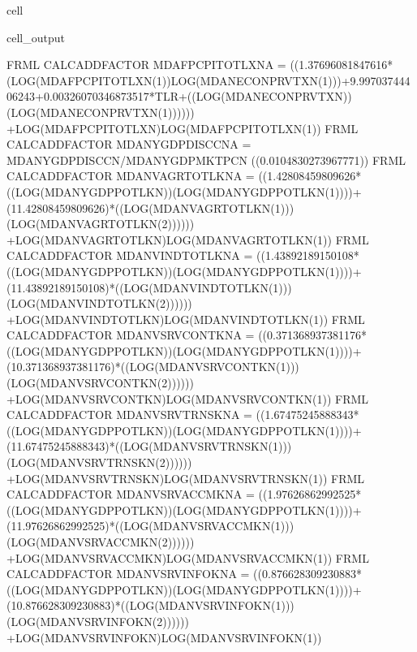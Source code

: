 \documentclass[letterpaper,10pt,english]{jupyterBook}
\begin{document}
\begin{sphinxuseclass}{cell}
\begin{sphinxVerbatimOutput}
\begin{sphinxuseclass}{cell_output}
\begin{sphinxVerbatim}[commandchars=\\\{\}]
FRML \PYGZlt{}CALC\PYGZus{}ADD\PYGZus{}FACTOR\PYGZgt{} MDAFPCPITOTLXN\PYGZus{}A = \PYGZhy{} ((\PYGZhy{}1.37696081847616*(LOG(MDAFPCPITOTLXN(\PYGZhy{}1))\PYGZhy{}LOG(MDANECONPRVTXN(\PYGZhy{}1)))+9.99703744406243+0.00326070346873517*T\PYGZus{}LR+((LOG(MDANECONPRVTXN))\PYGZhy{}(LOG(MDANECONPRVTXN(\PYGZhy{}1)))))) +LOG(MDAFPCPITOTLXN)\PYGZhy{}LOG(MDAFPCPITOTLXN(\PYGZhy{}1))\PYGZdl{}
FRML \PYGZlt{}CALC\PYGZus{}ADD\PYGZus{}FACTOR\PYGZgt{} MDANYGDPDISCCN\PYGZus{}A = MDANYGDPDISCCN/MDANYGDPMKTPCN\PYGZhy{} ((\PYGZhy{}0.0104830273967771)) \PYGZdl{}
FRML \PYGZlt{}CALC\PYGZus{}ADD\PYGZus{}FACTOR\PYGZgt{} MDANVAGRTOTLKN\PYGZus{}A = \PYGZhy{} ((1.42808459809626*((LOG(MDANYGDPPOTLKN))\PYGZhy{}(LOG(MDANYGDPPOTLKN(\PYGZhy{}1))))+(1\PYGZhy{}1.42808459809626)*((LOG(MDANVAGRTOTLKN(\PYGZhy{}1)))\PYGZhy{}(LOG(MDANVAGRTOTLKN(\PYGZhy{}2)))))) +LOG(MDANVAGRTOTLKN)\PYGZhy{}LOG(MDANVAGRTOTLKN(\PYGZhy{}1))\PYGZdl{}
FRML \PYGZlt{}CALC\PYGZus{}ADD\PYGZus{}FACTOR\PYGZgt{} MDANVINDTOTLKN\PYGZus{}A = \PYGZhy{} ((1.43892189150108*((LOG(MDANYGDPPOTLKN))\PYGZhy{}(LOG(MDANYGDPPOTLKN(\PYGZhy{}1))))+(1\PYGZhy{}1.43892189150108)*((LOG(MDANVINDTOTLKN(\PYGZhy{}1)))\PYGZhy{}(LOG(MDANVINDTOTLKN(\PYGZhy{}2)))))) +LOG(MDANVINDTOTLKN)\PYGZhy{}LOG(MDANVINDTOTLKN(\PYGZhy{}1))\PYGZdl{}
FRML \PYGZlt{}CALC\PYGZus{}ADD\PYGZus{}FACTOR\PYGZgt{} MDANVSRVCONTKN\PYGZus{}A = \PYGZhy{} ((0.371368937381176*((LOG(MDANYGDPPOTLKN))\PYGZhy{}(LOG(MDANYGDPPOTLKN(\PYGZhy{}1))))+(1\PYGZhy{}0.371368937381176)*((LOG(MDANVSRVCONTKN(\PYGZhy{}1)))\PYGZhy{}(LOG(MDANVSRVCONTKN(\PYGZhy{}2)))))) +LOG(MDANVSRVCONTKN)\PYGZhy{}LOG(MDANVSRVCONTKN(\PYGZhy{}1))\PYGZdl{}
FRML \PYGZlt{}CALC\PYGZus{}ADD\PYGZus{}FACTOR\PYGZgt{} MDANVSRVTRNSKN\PYGZus{}A = \PYGZhy{} ((1.67475245888343*((LOG(MDANYGDPPOTLKN))\PYGZhy{}(LOG(MDANYGDPPOTLKN(\PYGZhy{}1))))+(1\PYGZhy{}1.67475245888343)*((LOG(MDANVSRVTRNSKN(\PYGZhy{}1)))\PYGZhy{}(LOG(MDANVSRVTRNSKN(\PYGZhy{}2)))))) +LOG(MDANVSRVTRNSKN)\PYGZhy{}LOG(MDANVSRVTRNSKN(\PYGZhy{}1))\PYGZdl{}
FRML \PYGZlt{}CALC\PYGZus{}ADD\PYGZus{}FACTOR\PYGZgt{} MDANVSRVACCMKN\PYGZus{}A = \PYGZhy{} ((1.97626862992525*((LOG(MDANYGDPPOTLKN))\PYGZhy{}(LOG(MDANYGDPPOTLKN(\PYGZhy{}1))))+(1\PYGZhy{}1.97626862992525)*((LOG(MDANVSRVACCMKN(\PYGZhy{}1)))\PYGZhy{}(LOG(MDANVSRVACCMKN(\PYGZhy{}2)))))) +LOG(MDANVSRVACCMKN)\PYGZhy{}LOG(MDANVSRVACCMKN(\PYGZhy{}1))\PYGZdl{}
FRML \PYGZlt{}CALC\PYGZus{}ADD\PYGZus{}FACTOR\PYGZgt{} MDANVSRVINFOKN\PYGZus{}A = \PYGZhy{} ((0.876628309230883*((LOG(MDANYGDPPOTLKN))\PYGZhy{}(LOG(MDANYGDPPOTLKN(\PYGZhy{}1))))+(1\PYGZhy{}0.876628309230883)*((LOG(MDANVSRVINFOKN(\PYGZhy{}1)))\PYGZhy{}(LOG(MDANVSRVINFOKN(\PYGZhy{}2)))))) +LOG(MDANVSRVINFOKN)\PYGZhy{}LOG(MDANVSRVINFOKN(\PYGZhy{}1))\PYGZdl{}

\end{sphinxVerbatim}
\end{sphinxuseclass}
\end{sphinxVerbatimOutput}
\end{sphinxuseclass}
\end{document}
